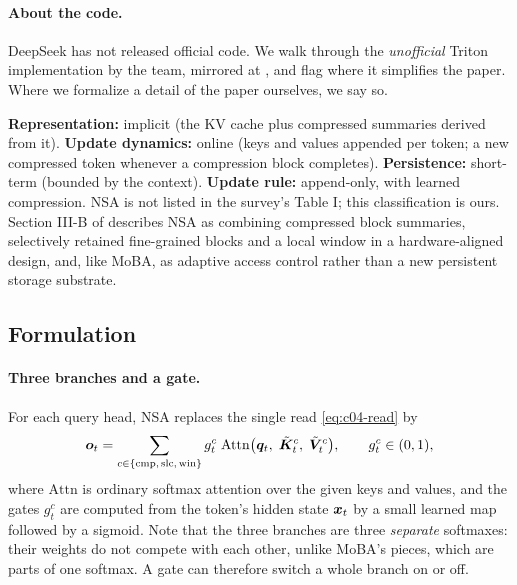 \paragraph{About the code.} DeepSeek has not released official code. We walk through the
\emph{unofficial} Triton implementation by the \fla{} team, mirrored at
, and flag where it simplifies the paper. Where we formalize
a detail of the paper ourselves, we say so.

\begin{taxonomy}
\textbf{Representation:} implicit (the KV cache plus compressed summaries derived from it).
\textbf{Update dynamics:} online (keys and values appended per token; a new compressed token
whenever a compression block completes).
\textbf{Persistence:} short-term (bounded by the context).
\textbf{Update rule:} append-only, with learned compression. NSA is not listed in the survey's
Table I; this classification is ours. Section III-B of \citet{zhoubian2026memory} describes NSA
as combining compressed block summaries, selectively retained fine-grained blocks and a local
window in a hardware-aligned design, and, like MoBA, as adaptive access control rather than a new
persistent storage substrate.
\end{taxonomy}

\subsection{Formulation}

\paragraph{Three branches and a gate.}
For each query head, NSA replaces the single read \eqref{eq:c04-read} by
\begin{equation}\label{eq:c04-nsa-combine}
  \bm{o}_t = \sum_{c\in\{\mathrm{cmp},\,\mathrm{slc},\,\mathrm{win}\}}
  g^{c}_t\;\mathrm{Attn}\big(\bm{q}_t,\;\tilde{\bm{K}}^{c}_t,\;\tilde{\bm{V}}^{c}_t\big),
  \qquad g^{c}_t\in(0,1),
\end{equation}
where $\mathrm{Attn}$ is ordinary softmax attention over the given keys and values, and the
gates $g^c_t$ are computed from the token's hidden state $\bm{x}_t$ by a small learned map followed
by a sigmoid. Note that the three branches are three \emph{separate} softmaxes: their weights do
not compete with each other, unlike MoBA's pieces, which are parts of one softmax. A gate can
therefore switch a whole branch on or off.

